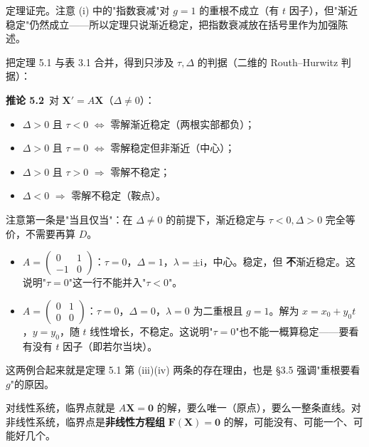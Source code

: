 \documentclass[11pt]{ctexart}
\newcommand{\X}{\mathbf{X}}\newcommand{\Y}{\mathbf{Y}}
\newcommand{\F}{\mathbf{F}}
\begin{document}
定理证完。注意 (i) 中的"指数衰减"对 $g=1$ 的重根不成立（有 $t$ 因子），但"渐近稳定"仍然成立——所以定理只说渐近稳定，把指数衰减放在括号里作为加强陈述。


把定理 5.1 与表 3.1 合并，得到只涉及 $\tau,\Delta$ 的判据（二维的 Routh–Hurwitz 判据）：

\textbf{推论 5.2}\ 对 $\X'=A\X$（$\Delta\neq0$）：
\begin{itemize}
\item $\Delta>0$ 且 $\tau<0$ $\iff$ 零解渐近稳定（两根实部都负）；
\item $\Delta>0$ 且 $\tau=0$ $\iff$ 零解稳定但非渐近（中心）；
\item $\Delta>0$ 且 $\tau>0$ $\Longrightarrow$ 零解不稳定；
\item $\Delta<0$ $\Longrightarrow$ 零解不稳定（鞍点）。
\end{itemize}
注意第一条是"当且仅当"：在 $\Delta\neq0$ 的前提下，渐近稳定与 $\tau<0,\Delta>0$ 完全等价，不需要再算 $D$。


\begin{itemize}
\item $A=\begin{pmatrix}0&1\\-1&0\end{pmatrix}$：$\tau=0$，$\Delta=1$，$\lambda=\pm\mathrm{i}$，中心。稳定，但 \textbf{不}渐近稳定。这说明"$\tau=0$"这一行不能并入"$\tau<0$"。
\item $A=\begin{pmatrix}0&1\\0&0\end{pmatrix}$：$\tau=0$，$\Delta=0$，$\lambda=0$ 为二重根且 $g=1$。解为 $x=x_0+y_0t$，$y=y_0$，随 $t$ 线性增长，不稳定。这说明"$\tau=0$"也不能一概算稳定——要看有没有 $t$ 因子（即若尔当块）。
\end{itemize}

这两例合起来就是定理 5.1 第 (iii)(iv) 两条的存在理由，也是 §3.5 强调"重根要看 $g$"的原因。



对线性系统，临界点就是 $A\X=\mathbf{0}$ 的解，要么唯一（原点），要么一整条直线。对非线性系统，临界点是\textbf{非线性方程组} $\F(\X)=\mathbf{0}$ 的解，可能没有、可能一个、可能好几个。
\end{document}
